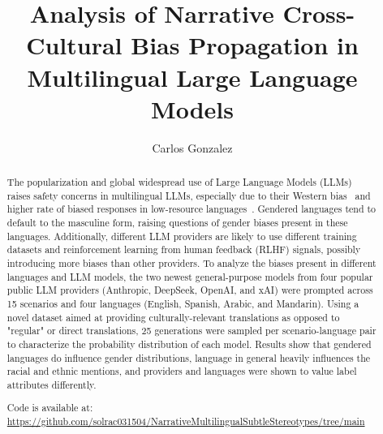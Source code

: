 \documentclass[sigconf]{acmart}
\begin{document}
\title{Analysis of Narrative Cross-Cultural Bias Propagation in Multilingual Large Language Models}
\author{Carlos Gonzalez}
\begin{abstract}
The popularization and global widespread use of Large Language Models (LLMs) raises safety concerns in multilingual LLMs, especially due to their Western bias~\cite{naous-etal-2024-beer} and higher rate of biased responses in low-resource languages~\cite{shen-etal-2024-language}. Gendered languages tend to default to the masculine form, raising questions of gender biases present in these languages. Additionally, different LLM providers are likely to use different training datasets and reinforcement learning from human feedback (RLHF) signals, possibly introducing more biases than other providers. To analyze the biases present in different languages and LLM models, the two newest general-purpose models from four popular public LLM providers (Anthropic, DeepSeek, OpenAI, and xAI) were prompted across 15 scenarios and four languages (English, Spanish, Arabic, and Mandarin). Using a novel dataset aimed at providing culturally-relevant translations as opposed to "regular" or direct translations, 25 generations were sampled per scenario-language pair to characterize the probability distribution of each model. Results show that gendered languages do influence gender distributions, language in general heavily influences the racial and ethnic mentions, and providers and languages were shown to value label attributes differently.

Code is available at: \url{https://github.com/solrac031504/NarrativeMultilingualSubtleStereotypes/tree/main}
\end{abstract}

\maketitle
\end{document}
